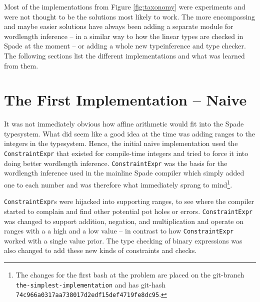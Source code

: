 Most of the implementations from Figure \ref{fig:taxonomy} were experiments and were not thought to be the solutions most likely to work. The more encompassing and maybe easier solutions have always been adding a separate module for wordlength inference -- in a similar way to how the linear types are checked in Spade at the moment -- or adding a whole new typeinference and type checker. The following sections list the different implementations and what was learned from them.


\section{The First Implementation -- Naive}
\label{sec:First}

It was not immediately obvious how affine arithmetic would fit into the Spade typesystem. What did seem like a good idea at the time was adding ranges to the integers in the typesystem. Hence, the initial naive implementation used the \verb+ConstraintExpr+ that existed for compile-time integers and tried to force it into doing better wordlength inference. \verb+ConstraintExpr+ was the basis for the wordlength inference used in the mainline Spade compiler which simply added one to each number and was therefore what immediately sprang to mind\cprotect\footnote{The changes for the first bash at the problem are placed on the git-branch \verb+the-simplest-implementation+ and has git-hash \verb+74c966a0317aa738017d2edf15def4719fe8dc95+.}.


\verb+ConstraintExpr+s were hijacked into supporting ranges, to see where the compiler started to complain and find other potential pot holes or errors. \verb+ConstraintExpr+ was changed to support addition, negation, and multiplication and operate on ranges with a a high and a low value -- in contrast to how \verb+ConstraintExpr+ worked with a single value prior. The type checking of binary expressions was also changed to add these new kinds of constraints and checks.

